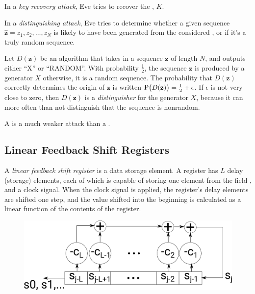 \begin{definition}\label{def:Attack-Key_Recovery}
  In a \emph{key recovery attack}, Eve tries to recover the , $K$.
\end{definition}

\begin{definition}\label{def:Attack-Distinguishing}
  In a \emph{distinguishing attack}, Eve tries to determine whether a given sequence $\hat{\mathbf{z}} = z_{1}, z_{2}, \ldots, z_{N}$ is likely to have been generated from the considered , or if it's a truly random sequence.

  Let $D(\mathbf{z})$ be an algorithm that takes in a sequence $\mathbf{z}$ of length $N$, and outputs either ``X'' or ``RANDOM''.
  With probability $\frac{1}{2}$, the sequence $\mathbf{z}$ is produced by a generator $X$ otherwise, it is a random sequence.
  The probability that $D(\mathbf{z})$ correctly determines the origin of $\mathbf{z}$ is written $\operatorname{\operatorname{P}} \bigl( D(\mathbf{z}) \bigr) = \frac{1}{2} + \epsilon$.
  If $\epsilon$ is not very close to zero, then $D(\mathbf{z})$ is a \emph{distinguisher} for the generator $X$, because it can more often than not distinguish that the sequence is nonrandom.

  \begin{remark}
    A  is a much weaker attack than a .
  \end{remark}
\end{definition}

\subsection{Linear Feedback Shift Registers}\label{subsec:LFSRs}
\begin{definition}\label{def:LFSR}
  A \emph{linear feedback shift register} is a data storage element.
  A register has $L$ delay (storage) elements, each of which is capable of storing one element from the field , and a clock signal.
  When the clock signal is applied, the register's delay elements are shifted one step, and the value shifted into the beginning is calculated as a linear function of the contents of the register.

  \begin{figure}[h!]
    \centering
    \includegraphics[scale=0.50]{./Drawings/EDIN01-Cryptography/Linear_Feedback_Shift_Register.png}
    \caption{}
    \label{fig:LSFR}
  \end{figure}
\end{definition}

